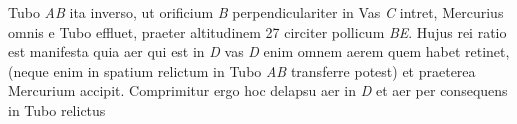                  Tubo \textit{AB} ita inverso, ut orificium \textit{B} perpendiculariter in Vas \textit{C} intret, Mercurius\protect{} omnis e 
                 \endlock Tubo effluet, praeter altitudinem 27 circiter pollicum \textit{BE}. Hujus rei ratio est manifesta quia aer qui  est in \textit{D}  vas \textit{D} enim omnem aerem quem habet  retinet, (neque enim in spatium relictum in Tubo \textit{AB} transferre potest) et praeterea Mercurium\protect{}  accipit. Comprimitur ergo hoc delapsu aer in \textit{D} et aer per consequens in Tubo relictus  %
